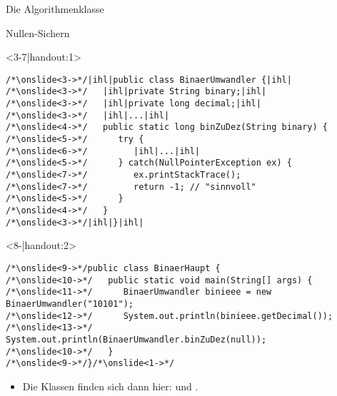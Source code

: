 \begin{frame}[c]{Die Algorithmenklasse}
%
\end{frame}
\SidebarReset


\SidebarSolution
\begin{frame}[fragile, c]{Nullen-Sichern}
\SetupLstHl
\begin{onlyenv}<3-7|handout:1>
\begin{verbatim}
/*\onslide<3->*/|ihl|public class BinaerUmwandler {|ihl|
/*\onslide<3->*/   |ihl|private String binary;|ihl|
/*\onslide<3->*/   |ihl|private long decimal;|ihl|
/*\onslide<3->*/   |ihl|...|ihl|
/*\onslide<4->*/   public static long binZuDez(String binary) {
/*\onslide<5->*/      try {
/*\onslide<6->*/         |ihl|...|ihl|
/*\onslide<5->*/      } catch(NullPointerException ex) {
/*\onslide<7->*/         ex.printStackTrace();
/*\onslide<7->*/         return -1; // "sinnvoll"
/*\onslide<5->*/      }
/*\onslide<4->*/   }
/*\onslide<3->*/|ihl|}|ihl|
\end{verbatim}
\end{onlyenv}
\begin{onlyenv}<8-|handout:2>
\begin{verbatim}
/*\onslide<9->*/public class BinaerHaupt {
/*\onslide<10->*/   public static void main(String[] args) {
/*\onslide<11->*/      BinaerUmwandler binieee = new BinaerUmwandler("10101");
/*\onslide<12->*/      System.out.println(binieee.getDecimal());
/*\onslide<13->*/      System.out.println(BinaerUmwandler.binZuDez(null));
/*\onslide<10->*/   }
/*\onslide<9->*/}/*\onslide<1->*/
\end{verbatim}
\end{onlyenv}
\begin{itemize}
   \item<14-|handout:2> Die Klassen finden sich dann hier:  und .
\end{itemize}
\end{frame}
\SidebarReset

